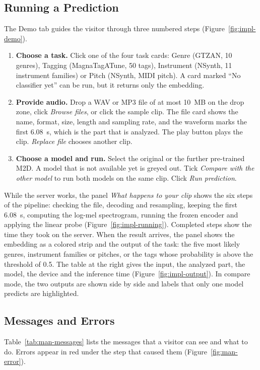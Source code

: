 \subsection{Running a Prediction}
The Demo tab guides the visitor through three numbered steps (Figure~\ref{fig:impl-demo}).
\begin{enumerate}
  \item \textbf{Choose a task.} Click one of the four task cards: Genre (GTZAN, 10 genres), Tagging (MagnaTagATune, 50 tags), Instrument (NSynth, 11 instrument families) or Pitch (NSynth, MIDI pitch). A card marked ``No classifier yet'' can be run, but it returns only the embedding.
  \item \textbf{Provide audio.} Drop a WAV or MP3 file of at most 10~MB on the drop zone, click \emph{Browse files}, or click the sample clip. The file card shows the name, format, size, length and sampling rate, and the waveform marks the first 6.08~s, which is the part that is analyzed. The play button plays the clip. \emph{Replace file} chooses another clip.
  \item \textbf{Choose a model and run.} Select the original or the further pre-trained M2D. A model that is not available yet is greyed out. Tick \emph{Compare with the other model} to run both models on the same clip. Click \emph{Run prediction}.
\end{enumerate}
While the server works, the panel \emph{What happens to your clip} shows the six steps of the pipeline: checking the file, decoding and resampling, keeping the first 6.08~s, computing the log-mel spectrogram, running the frozen encoder and applying the linear probe (Figure~\ref{fig:impl-running}). Completed steps show the time they took on the server. When the result arrives, the panel shows the embedding as a colored strip and the output of the task: the five most likely genres, instrument families or pitches, or the tags whose probability is above the threshold of 0.5. The table at the right gives the input, the analyzed part, the model, the device and the inference time (Figure~\ref{fig:impl-output}). In compare mode, the two outputs are shown side by side and labels that only one model predicts are highlighted.

\subsection{Messages and Errors}
Table~\ref{tab:man-messages} lists the messages that a visitor can see and what to do. Errors appear in red under the step that caused them (Figure~\ref{fig:man-error}).

